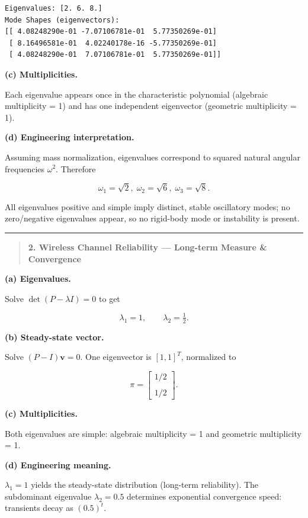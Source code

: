 \documentclass[
  letterpaper,
  DIV=11,
  numbers=noendperiod]{scrreprt}
\begin{document}
\begin{verbatim}
Eigenvalues: [2. 6. 8.]
Mode Shapes (eigenvectors):
[[ 4.08248290e-01 -7.07106781e-01  5.77350269e-01]
 [ 8.16496581e-01  4.02240178e-16 -5.77350269e-01]
 [ 4.08248290e-01  7.07106781e-01  5.77350269e-01]]
\end{verbatim}

\textbf{(c) Multiplicities.}

Each eigenvalue appears once in the characteristic polynomial (algebraic
multiplicity = 1) and has one independent eigenvector (geometric
multiplicity = 1).

\textbf{(d) Engineering interpretation.}

Assuming mass normalization, eigenvalues correspond to squared natural
angular frequencies \(\omega^2\). Therefore

\[\omega_1=\sqrt{2},\;\omega_2=\sqrt{6},\;\omega_3=\sqrt{8}.\]

All eigenvalues positive and simple imply distinct, stable oscillatory
modes; no zero/negative eigenvalues appear, so no rigid-body mode or
instability is present.

\begin{center}\rule{0.5\linewidth}{0.5pt}\end{center}

\begin{quote}
\textbf{2. Wireless Channel Reliability --- Long-term Measure \&
Convergence}
\end{quote}

\textbf{(a) Eigenvalues.}

Solve \(\det(P-\lambda I)=0\) to get

\[\lambda_1 = 1,\qquad \lambda_2 = \tfrac{1}{2}.\]

\textbf{(b) Steady-state vector.}

Solve \((P-I)\mathbf v=0\). One eigenvector is \([1,1]^T\), normalized
to

\[\pi = \begin{bmatrix}1/2\\\\[4pt]1/2\end{bmatrix}.\]

\textbf{(c) Multiplicities.}

Both eigenvalues are simple: algebraic multiplicity = 1 and geometric
multiplicity = 1.

\textbf{(d) Engineering meaning.}

\(\lambda_1=1\) yields the steady-state distribution (long-term
reliability). The subdominant eigenvalue \(\lambda_2=0.5\) determines
exponential convergence speed: transients decay as \((0.5)^t\).
\end{document}

